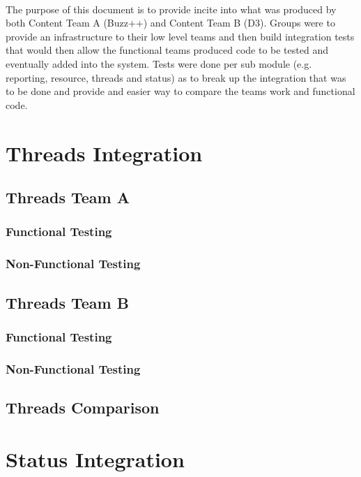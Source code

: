 \documentclass[12pt, oneside]{article}
\begin{document}
	\paragraph{}
	The purpose of this document is to provide incite into what was produced by both Content  Team A (Buzz++) and Content Team B (D3). Groups were to provide an infrastructure to their low level teams and then build integration tests that would then allow the functional teams produced code to be tested and eventually added into the system. Tests were done per sub module (e.g. reporting, resource, threads and status) as to break up the integration that was to be done and provide and easier way to compare the teams work and functional code.
\section{Threads Integration}
	\subsection{Threads Team A}	
		\subsubsection{Functional Testing}
			
		\subsubsection{Non-Functional Testing }
			
	
	\subsection{Threads Team B}	
		\subsubsection{Functional Testing}
			
		\subsubsection{Non-Functional Testing }
			
	
	\subsection{Threads Comparison}
\newpage 
\section{Status Integration}
\end{document}
